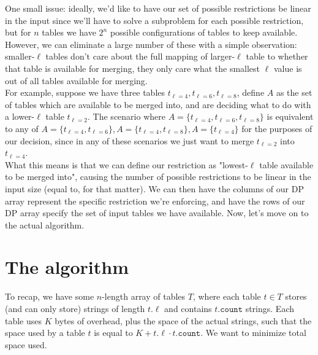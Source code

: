 \documentclass{article}[12]
\begin{document}
One small issue: ideally, we'd like to have our set of possible restrictions be linear in the input since we'll have to solve a subproblem for each possible restriction, but for $n$ tables we have $2^n$ possible configurations of tables to keep available. However, we can eliminate a large number of these with a simple observation: smaller-$\ell$ tables don't care about the full mapping of larger-$\ell$ table to whether that table is available for merging, they only care what the smallest $\ell$ value is out of all tables available for merging.\\

For example, suppose we have three tables $t_{\ell = 4}, t_{\ell = 6}, t_{\ell = 8}$, define $A$ as the set of tables which are available to be merged into, and are deciding what to do with a lower-$\ell$ table $t_{\ell = 2}$. The scenario where $A = \{ t_{\ell = 4}, t_{\ell = 6}, t_{\ell = 8} \}$ is equivalent to any of $A = \{ t_{\ell = 4}, t_{\ell = 6} \}, A = \{ t_{\ell = 4}, t_{\ell = 8} \}, A = \{ t_{\ell = 4} \}$ for the purposes of our decision, since in any of these scenarios we just want to merge $t_{\ell = 2}$ into $t_{\ell = 4}$.\\

What this means is that we can define our restriction as "lowest-$\ell$ table available to be merged into", causing the number of possible restrictions to be linear in the input size (equal to, for that matter). We can then have the columns of our DP array represent the specific restriction we're enforcing, and have the rows of our DP array specify the set of input tables we have available. Now, let's move on to the actual algorithm.\\

\section{The algorithm}
To recap, we have some $n$-length array of tables $T$, where each table $t \in T$ stores (and can only store) strings of length $t.\ell$ and contains $t.\texttt{count}$ strings. Each table uses $K$ bytes of overhead, plus the space of the actual strings, such that the space used by a table $t$ is equal to $K + t.\ell \cdot t.\texttt{count}$. We want to minimize total space used.
\end{document}

